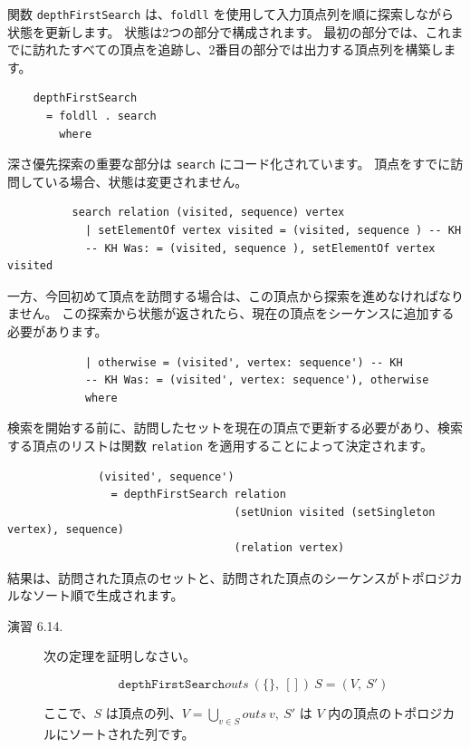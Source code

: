 \documentclass{jbook}
\begin{document}
関数 \texttt{depthFirstSearch} は、\texttt{foldll} を使用して入力頂点列を順に探索しながら状態を更新します。
状態は2つの部分で構成されます。
最初の部分では、これまでに訪れたすべての頂点を追跡し、2番目の部分では出力する頂点列を構築します。

\begin{verbatim}
	depthFirstSearch
	  = foldll . search
	    where
\end{verbatim}

深さ優先探索の重要な部分は \texttt{search} にコード化されています。
頂点をすでに訪問している場合、状態は変更されません。

\begin{verbatim}
	      search relation (visited, sequence) vertex
	        | setElementOf vertex visited = (visited, sequence ) -- KH
	        -- KH Was: = (visited, sequence ), setElementOf vertex visited
\end{verbatim}

一方、今回初めて頂点を訪問する場合は、この頂点から探索を進めなければなりません。
この探索から状態が返されたら、現在の頂点をシーケンスに追加する必要があります。

\begin{verbatim}
	        | otherwise = (visited', vertex: sequence') -- KH
	        -- KH Was: = (visited', vertex: sequence'), otherwise
	        where
\end{verbatim}

検索を開始する前に、訪問したセットを現在の頂点で更新する必要があり、検索する頂点のリストは関数 \texttt{relation} を適用することによって決定されます。

\begin{verbatim}
	          (visited', sequence')
	            = depthFirstSearch relation
	                               (setUnion visited (setSingleton vertex), sequence)
	                               (relation vertex)
\end{verbatim}

結果は、訪問された頂点のセットと、訪問された頂点のシーケンスがトポロジカルなソート順で生成されます。

\begin{description}
	\item[演習 6.14.] 次の定理を証明しなさい。

		\[\texttt{depthFirstSearch} outs ~ (\{\}, ~ []) ~ S = (V, ~ S')\]

		ここで、$S$ は頂点の列、$V = \bigcup_{v \in S} outs ~ v, ~ S'$ は $V$ 内の頂点のトポロジカルにソートされた列です。
\end{description}
\end{document}
